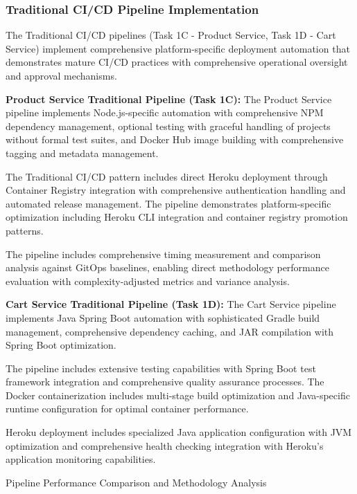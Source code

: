 \subsubsection{Traditional CI/CD Pipeline Implementation}

The Traditional CI/CD pipelines (Task 1C - Product Service, Task 1D - Cart Service) implement comprehensive platform-specific deployment automation that demonstrates mature CI/CD practices with comprehensive operational oversight and approval mechanisms.

\textbf{Product Service Traditional Pipeline (Task 1C):}
The Product Service pipeline implements Node.js-specific automation with comprehensive NPM dependency management, optional testing with graceful handling of projects without formal test suites, and Docker Hub image building with comprehensive tagging and metadata management.

The Traditional CI/CD pattern includes direct Heroku deployment through Container Registry integration with comprehensive authentication handling and automated release management. The pipeline demonstrates platform-specific optimization including Heroku CLI integration and container registry promotion patterns.

The pipeline includes comprehensive timing measurement and comparison analysis against GitOps baselines, enabling direct methodology performance evaluation with complexity-adjusted metrics and variance analysis.

\textbf{Cart Service Traditional Pipeline (Task 1D):}
The Cart Service pipeline implements Java Spring Boot automation with sophisticated Gradle build management, comprehensive dependency caching, and JAR compilation with Spring Boot optimization.

The pipeline includes extensive testing capabilities with Spring Boot test framework integration and comprehensive quality assurance processes. The Docker containerization includes multi-stage build optimization and Java-specific runtime configuration for optimal container performance.

Heroku deployment includes specialized Java application configuration with JVM optimization and comprehensive health checking integration with Heroku's application monitoring capabilities.

\begin{table}[H]
\centering
\caption{Pipeline Performance Comparison and Methodology Analysis}
\label{tab:pipeline-performance-comparison}
\end{table}

